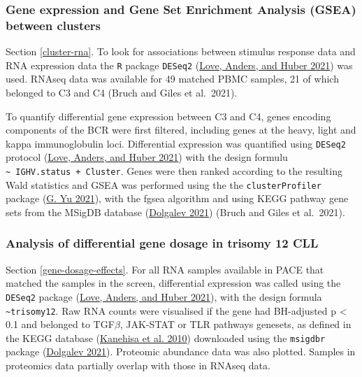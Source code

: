 \documentclass[11pt, a4paper, twosided]{book}
\begin{document}
\hypertarget{cluster-rna-method}{%
\subsubsection{Gene expression and Gene Set Enrichment Analysis (GSEA) between clusters}\label{cluster-rna-method}}

Section \ref{cluster-rna}. To look for associations between stimulus response data and RNA expression data the \texttt{R} package \texttt{DESeq2} (\protect\hyperlink{ref-R-DESeq2}{Love, Anders, and Huber 2021}) was used. RNAseq data was available for 49 matched PBMC samples, 21 of which belonged to C3 and C4 (Bruch and Giles et al.~2021).

To quantify differential gene expression between C3 and C4, genes encoding components of the BCR were first filtered, including genes at the heavy, light and kappa immunoglobulin loci. Differential expression was quantified using \texttt{DESeq2} protocol (\protect\hyperlink{ref-R-DESeq2}{Love, Anders, and Huber 2021}) with the design formulu \texttt{\textasciitilde{}\ IGHV.status\ +\ Cluster}. Genes were then ranked according to the resulting Wald statistics and GSEA was performed using the the \texttt{clusterProfiler} package (\protect\hyperlink{ref-R-clusterProfiler}{G. Yu 2021}), with the fgsea algorithm and using KEGG pathway gene sets from the MSigDB database (\protect\hyperlink{ref-R-msigdbr}{Dolgalev 2021}) (Bruch and Giles et al.~2021).

\hypertarget{gene-dosage-effects-method}{%
\subsubsection{Analysis of differential gene dosage in trisomy 12 CLL}\label{gene-dosage-effects-method}}

Section \ref{gene-dosage-effects}. For all RNA samples available in PACE that matched the samples in the screen, differential expression was called using the \texttt{DESeq2} package (\protect\hyperlink{ref-R-DESeq2}{Love, Anders, and Huber 2021}), with the design formula \texttt{\textasciitilde{}trisomy12}. Raw RNA counts were visualised if the gene had BH-adjusted p \textless{} 0.1 and belonged to TGF\(\beta\), JAK-STAT or TLR pathways genesets, as defined in the KEGG database (\protect\hyperlink{ref-KEGG}{Kanehisa et al. 2010}) downloaded using the \texttt{msigdbr} package (\protect\hyperlink{ref-R-msigdbr}{Dolgalev 2021}). Proteomic abundance data was also plotted. Samples in proteomics data partially overlap with those in RNAseq data.
\end{document}

